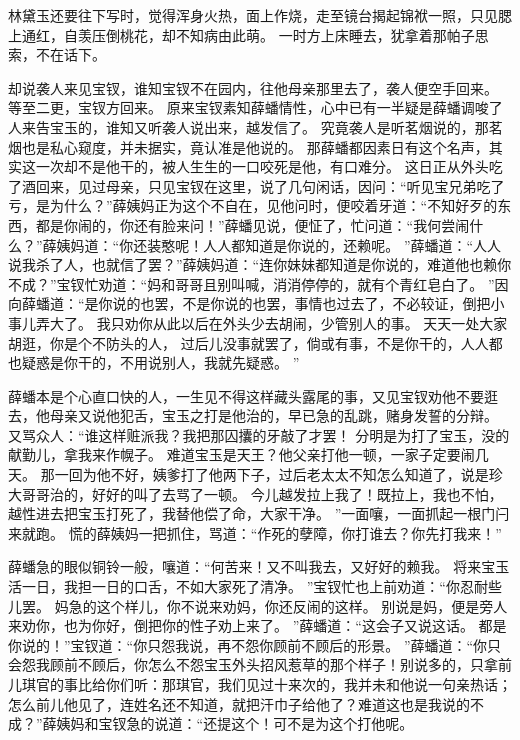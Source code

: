 \hop
林黛玉还要往下写时，觉得浑身火热，面上作烧，走至镜台揭起锦袱一照，只见腮上通红，自羡压倒桃花，却不知病由此萌。
一时方上床睡去，犹拿着那帕子思索，不在话下。
\par
却说袭人来见宝钗，谁知宝钗不在园内，往他母亲那里去了，袭人便空手回来。
等至二更，宝钗方回来。
原来宝钗素知薛蟠情性，心中已有一半疑是薛蟠调唆了人来告宝玉的，谁知又听袭人说出来，越发信了。
究竟袭人是听茗烟说的，那茗烟也是私心窥度，并未据实，竟认准是他说的。
那薛蟠都因素日有这个名声，其实这一次却不是他干的，被人生生的一口咬死是他，有口难分。
这日正从外头吃了酒回来，见过母亲，只见宝钗在这里，说了几句闲话，因问：“听见宝兄弟吃了亏，是为什么？”薛姨妈正为这个不自在，见他问时，便咬着牙道：“不知好歹的东西，都是你闹的，你还有脸来问！”薛蟠见说，便怔了，忙问道：“我何尝闹什么？”薛姨妈道：“你还装憨呢！人人都知道是你说的，还赖呢。
”薛蟠道：“人人说我杀了人，也就信了罢？”薛姨妈道：“连你妹妹都知道是你说的，难道他也赖你不成？”宝钗忙劝道：“妈和哥哥且别叫喊，消消停停的，就有个青红皂白了。
”因向薛蟠道：“是你说的也罢，不是你说的也罢，事情也过去了，不必较证，倒把小事儿弄大了。
我只劝你从此以后在外头少去胡闹，少管别人的事。
天天一处大家胡逛，你是个不防头的人，
过后儿没事就罢了，倘或有事，不是你干的，人人都也疑惑是你干的，不用说别人，我就先疑惑。
”\par
薛蟠本是个心直口快的人，一生见不得这样藏头露尾的事，又见宝钗劝他不要逛去，他母亲又说他犯舌，宝玉之打是他治的，早已急的乱跳，赌身发誓的分辩。
又骂众人：“谁这样赃派我？我把那囚攮的牙敲了才罢！
分明是为打了宝玉，没的献勤儿，拿我来作幌子。
难道宝玉是天王？他父亲打他一顿，一家子定要闹几天。
那一回为他不好，姨爹打了他两下子，过后老太太不知怎么知道了，说是珍大哥哥治的，好好的叫了去骂了一顿。
今儿越发拉上我了！既拉上，我也不怕，越性进去把宝玉打死了，我替他偿了命，大家干净。
”一面嚷，一面抓起一根门闩来就跑。
慌的薛姨妈一把抓住，骂道：“作死的孽障，你打谁去？你先打我来！”\par
薛蟠急的眼似铜铃一般，嚷道：“何苦来！又不叫我去，又好好的赖我。
将来宝玉活一日，我担一日的口舌，不如大家死了清净。
”宝钗忙也上前劝道：“你忍耐些儿罢。
妈急的这个样儿，你不说来劝妈，你还反闹的这样。
别说是妈，便是旁人来劝你，也为你好，倒把你的性子劝上来了。
”薛蟠道：“这会子又说这话。
都是你说的！”宝钗道：“你只怨我说，再不怨你顾前不顾后的形景。
”薛蟠道：“你只会怨我顾前不顾后，你怎么不怨宝玉外头招风惹草的那个样子！别说多的，只拿前儿琪官的事比给你们听：那琪官，我们见过十来次的，我并未和他说一句亲热话；怎么前儿他见了，连姓名还不知道，就把汗巾子给他了？难道这也是我说的不成？”薛姨妈和宝钗急的说道：“还提这个！可不是为这个打他呢。
